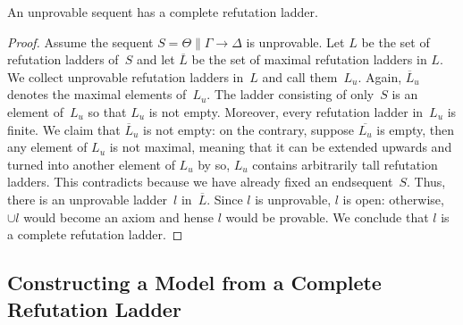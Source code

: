    \begin{proposition}
    \label{comprefl}
    An unprovable sequent has a complete refutation ladder.
   \end{proposition}
   \begin{proof}
    Assume the sequent
    $S = \Theta\parallel \Gamma\longrightarrow\Delta$
    is unprovable.
    Let $L$ be the set of refutation ladders of~$S$ and
    let $\overline L$ be the set of maximal refutation ladders in $L$.
    We collect unprovable refutation ladders in~$L$ and call them~$L_u$.
    Again, $\overline L_u$ denotes the maximal elements of~$L_u$.
    The ladder consisting of only~$S$ is an element of~$L_u$
    so that $L_u$ is not empty.
    Moreover, every refutation ladder in~$L_u$ is finite.
    We claim that
    $\overline L_u$ is not empty: on the contrary,
    suppose $\overline{L_u}$ is empty, then any element of $L_u$ is not
    maximal, meaning that it can be extended upwards and turned into
    another element of $L_u$ by  so, $L_u$ contains
    arbitrarily tall refutation ladders.  This contradicts
     because we have already fixed an
    endsequent~$S$.
    Thus,
    there is an unprovable ladder~$l$ in~$\overline L$.
    Since $l$ is unprovable, $l$ is open: otherwise, $\cup l$ would
    become an axiom and hense $l$ would be provable.
    We conclude that $l$ is a complete refutation ladder.
   \end{proof}


   \subsection{Constructing a Model from a Complete Refutation Ladder}

